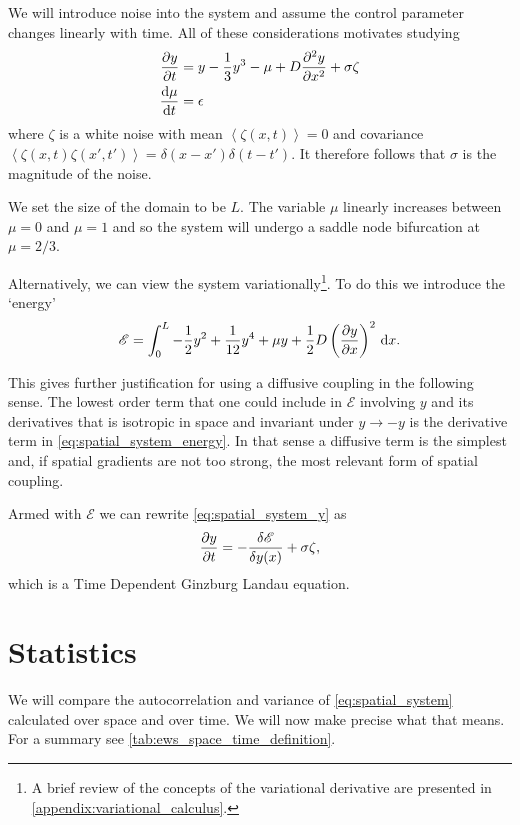 We will introduce noise into the system and assume the control parameter changes linearly with time. All of these considerations motivates studying
\begin{subequations}
\label{eq:spatial_system}
  \begin{align}
    \pdv{y}{t} &= y - \frac{1}{3}y^3 - \mu + D\pdv[2]{y}{x} + \sigma\zeta \label{eq:spatial_system_y} \\
    \dv{\mu}{t}&= \epsilon \label{eq:spatial_system_mu}
  \end{align}
\end{subequations}
where $\zeta$ is a white noise with mean $\left\langle \zeta\left(x,t\right) \right\rangle = 0$ and covariance $\left\langle \zeta\left(x,t\right)\zeta(x',t')\right\rangle = \delta(x-x')\delta(t-t')$.
It therefore follows that $\sigma$ is the magnitude of the noise.

We set the size of the domain to be $L$. The variable $\mu$ linearly increases between $\mu = 0$ and $\mu = 1$ and so the system will undergo a saddle node
bifurcation at $\mu = 2/3$.

Alternatively, we can view the system variationally\footnote{A brief review of the concepts of the variational derivative are presented in \cref{appendix:variational_calculus}.}.
To do this we introduce the `energy'
\begin{equation}
  \label{eq:spatial_system_energy}
  \mathscr{E} = \int_0^L -\frac{1}{2}y^2 + \frac{1}{12}y^4 + \mu y + \frac{1}{2}D\left(\pdv{y}{x}\right)^2\,\mathrm{d}{x}.
\end{equation}

This gives further justification for using a diffusive coupling in the following sense. The lowest order term that one could include in $\mathscr{E}$ involving
$y$ and its derivatives that is isotropic in space and invariant under $y \rightarrow -y$ is the derivative term in \cref{eq:spatial_system_energy}. In that sense a diffusive term is the simplest
and, if spatial gradients are not too strong, the most relevant form of spatial coupling.

Armed with $\mathscr{E}$ we can rewrite \cref{eq:spatial_system_y} as
\begin{equation}
  \label{eq:spatial_system_y_variational}
    \pdv{y}{t} = -\fdv{\mathscr{E}}{y(x)}  + \sigma\zeta, 
\end{equation}
which is a Time Dependent Ginzburg Landau equation\cite{goldenfeld1992}.

\section{Statistics}
We will compare the autocorrelation and variance of \cref{eq:spatial_system} calculated over space and over time. We will now
make precise what that means. For a summary see \cref{tab:ews_space_time_definition}.

